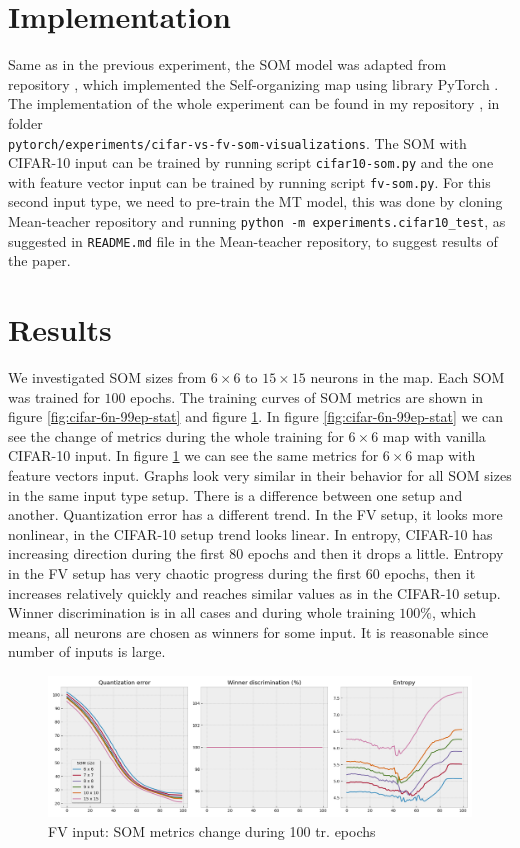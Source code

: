 \section{Implementation}
Same as in the previous experiment, the SOM model was adapted from repository \cite{som-repo}, which implemented the Self-organizing map using library PyTorch \cite{pytorch}. The implementation of the whole experiment can be found in my repository \cite{dt-mt-repo}, in folder \\ \texttt{pytorch/experiments/cifar-vs-fv-som-visualizations}. The SOM with CIFAR-10 input can be trained by running script \texttt{cifar10-som.py} and the one with feature vector input can be trained by running script \texttt{fv-som.py}. For this second input type, we need to pre-train the MT model, this was done by cloning Mean-teacher repository \cite{curiousai} and running \texttt{python -m experiments.cifar10\_test}, as suggested in \texttt{README.md} file in the Mean-teacher repository, to suggest results of the paper.

\section{Results}
We investigated SOM sizes from $6\times6$ to $15\times15$ neurons in the map.
Each SOM was trained for $100$ epochs. The training curves of SOM metrics are shown in figure \ref{fig:cifar-6n-99ep-stat} and figure \ref{fig:fv-6n-99ep-stat}. In figure \ref{fig:cifar-6n-99ep-stat} we can see the change of metrics during the whole training for $6 \times 6$ map with vanilla CIFAR-10 input. In figure \ref{fig:fv-6n-99ep-stat} we can see the same metrics for $6 \times 6$ map with feature vectors input. 
 Graphs look very similar in their behavior for all SOM sizes in the same input type setup. There is a difference between one setup and another. Quantization error has a different trend. In the FV setup, it looks more nonlinear, in the CIFAR-10 setup trend looks linear. In entropy, CIFAR-10 has increasing direction during the first $80$ epochs and then it drops a little. Entropy in the FV setup has very chaotic progress during the first $60$ epochs, then it increases relatively quickly and reaches similar values as in the CIFAR-10 setup. Winner discrimination is in all cases and during whole training $100\%$, which means, all neurons are chosen as winners for some input. It is reasonable since number of inputs is large.

\begin{figure}[h!]
    \centering
    \includegraphics[width=1\textwidth]{figs/fv-som-measures.png}
    \caption{FV input: SOM metrics change during 100 tr. epochs}
    \label{fig:fv-6n-99ep-stat}
\end{figure}

